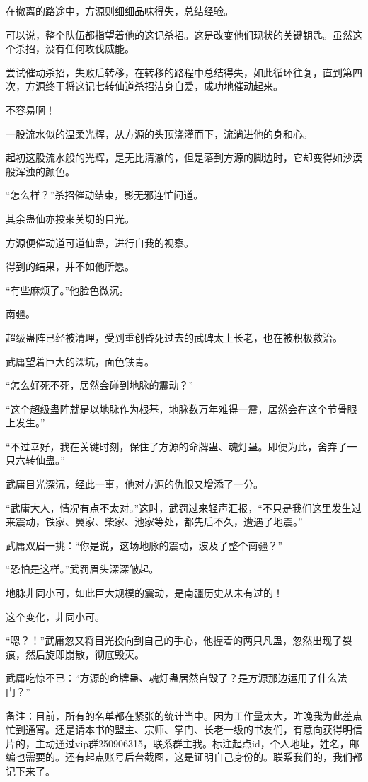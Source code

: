 \begin{this_body}
在撤离的路途中，方源则细细品味得失，总结经验。

可以说，整个队伍都指望着他的这记杀招。这是改变他们现状的关键钥匙。虽然这个杀招，没有任何攻伐威能。

尝试催动杀招，失败后转移，在转移的路程中总结得失，如此循环往复，直到第四次，方源终于将这记七转仙道杀招洁身自爱，成功地催动起来。

不容易啊！

一股流水似的温柔光辉，从方源的头顶浇灌而下，流淌进他的身和心。

起初这股流水般的光辉，是无比清澈的，但是落到方源的脚边时，它却变得如沙漠般浑浊的颜色。

“怎么样？”杀招催动结束，影无邪连忙问道。

其余蛊仙亦投来关切的目光。

方源便催动道可道仙蛊，进行自我的视察。

得到的结果，并不如他所愿。

“有些麻烦了。”他脸色微沉。

南疆。

超级蛊阵已经被清理，受到重创昏死过去的武碑太上长老，也在被积极救治。

武庸望着巨大的深坑，面色铁青。

“怎么好死不死，居然会碰到地脉的震动？”

“这个超级蛊阵就是以地脉作为根基，地脉数万年难得一震，居然会在这个节骨眼上发生。”

“不过幸好，我在关键时刻，保住了方源的命牌蛊、魂灯蛊。即便为此，舍弃了一只六转仙蛊。”

武庸目光深沉，经此一事，他对方源的仇恨又增添了一分。

“武庸大人，情况有点不太对。”这时，武罚过来轻声汇报，“不只是我们这里发生过来震动，铁家、翼家、柴家、池家等处，都先后不久，遭遇了地震。”

武庸双眉一挑：“你是说，这场地脉的震动，波及了整个南疆？”

“恐怕是这样。”武罚眉头深深皱起。

地脉非同小可，如此巨大规模的震动，是南疆历史从未有过的！

这个变化，非同小可。

“嗯？！”武庸忽又将目光投向到自己的手心，他握着的两只凡蛊，忽然出现了裂痕，然后旋即崩散，彻底毁灭。

武庸吃惊不已：“方源的命牌蛊、魂灯蛊居然自毁了？是方源那边运用了什么法门？”

备注：目前，所有的名单都在紧张的统计当中。因为工作量太大，昨晚我为此差点忙到通宵。还是请本书的盟主、宗师、掌门、长老一级的书友们，有意向获得明信片的，主动通过vip群250906315，联系群主我。标注起点id，个人地址，姓名，邮编也需要的。还有起点账号后台截图，这是证明自己身份的。联系我们的，我们都记下来了。

\end{this_body}

